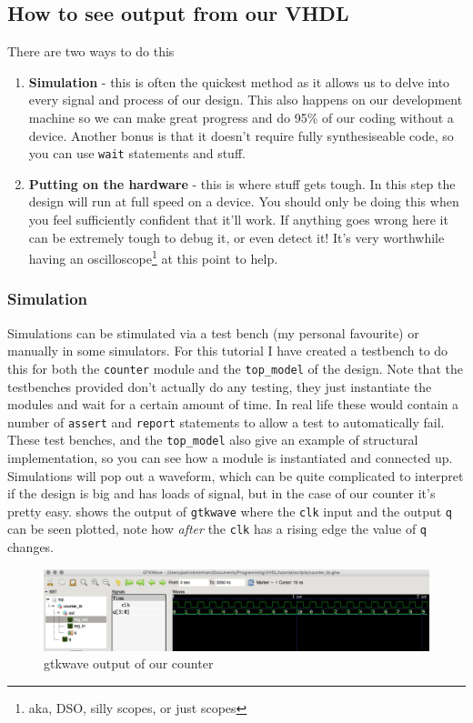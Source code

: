 \documentclass[11pt,a4paper]{article}
\begin{document}
\subsection{How to see output from our VHDL}
There are two ways to do this
\begin{enumerate}
    \item \textbf{Simulation} - this is often the quickest method as it allows us to delve into every signal and process of our design. This also happens on our development machine so we can make great progress and do 95\% of our coding without a device. Another bonus is that it doesn't require fully synthesiseable code, so you can use \texttt{wait} statements and stuff.
    \item \textbf{Putting on the hardware} - this is where stuff gets tough. In this step the design will run at full speed on a device. You should only be doing this when you feel sufficiently confident that it'll work. If anything goes wrong here it can be extremely tough to debug it, or even detect it! It's very worthwhile having an oscilloscope\footnote{aka, DSO, silly scopes, or just scopes} at this point to help. 
\end{enumerate}

\subsubsection{Simulation}
Simulations can be stimulated via a test bench (my personal favourite) or manually in some simulators. For this tutorial I have created a testbench to do this for both the \texttt{counter} module and the \texttt{top\_model} of the design. Note that the testbenches provided don't actually do any testing, they just instantiate the modules and wait for a certain amount of time. In real life these would contain a number of \texttt{assert} and \texttt{report} statements to allow a test to automatically fail. These test benches, and the \texttt{top\_model} also give an example of structural implementation, so you can see how a module is instantiated and connected up. Simulations will pop out a waveform,  which can be quite complicated to interpret if the design is big and has loads of signal, but in the case of our counter it's pretty easy.  shows the output of \texttt{gtkwave} where the \texttt{clk} input and the output \texttt{q} can be seen plotted, note how \emph{after} the \texttt{clk} has a rising edge the value of \texttt{q} changes.

\begin{figure}[H]
    \begin{center}
        \includegraphics[width=\textwidth]{./src/counter_waveform.png}
    \end{center}
    \caption{gtkwave output of our counter}
    \label{fig:counter_wave}
\end{figure}
\end{document}
